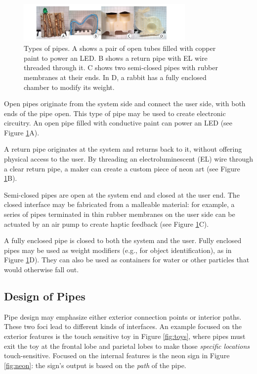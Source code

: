 \begin{figure}[h]
\centering
    \includegraphics[width=3.4in]{figures/types.png}
\caption{Types of pipes.  A shows a pair of open tubes filled with copper paint to power an LED.  B shows a return pipe with EL wire threaded through it.  C shows two semi-closed pipes with rubber membranes at their ends.  In D, a rabbit has a fully enclosed chamber to modify its weight. }
\label{fig:pipespace}
\end{figure}

Open pipes originate from the system side and connect the user side, with both ends of the pipe open. This type of pipe may be used to create electronic circuitry.  An open pipe filled with conductive paint can power an LED (see Figure \ref{fig:pipespace}A).

A return pipe originates at the system and returns back to it, without offering physical access to the user.  By threading an electroluminescent (EL) wire through a clear return pipe, a maker can create a custom piece of neon art (see Figure \ref{fig:pipespace}B).

Semi-closed pipes are open at the system end and closed at the user end.  The closed interface may be fabricated from a malleable material: for example, a series of pipes terminated in thin rubber membranes on the user side can be actuated by an air pump to create haptic feedback (see Figure \ref{fig:pipespace}C).

A fully enclosed pipe is closed to both the system and the user.  Fully enclosed pipes may be used as weight modifiers (e.g., for object identification), as in Figure \ref{fig:pipespace}D).  They can also be used as containers for water or other particles that would otherwise fall out.

\subsection{Design of Pipes}
Pipe design may emphasize either exterior connection points or interior paths.  These two foci lead to different kinds of interfaces.  An example focused on the exterior features is the touch sensitive toy in Figure \ref{fig:toys}, where pipes must exit the toy at the frontal lobe and parietal lobes to make those \emph{specific locations} touch-sensitive.  Focused on the internal features is the neon sign in Figure \ref{fig:neon}: the sign's output is based on the \emph{path} of the pipe.

